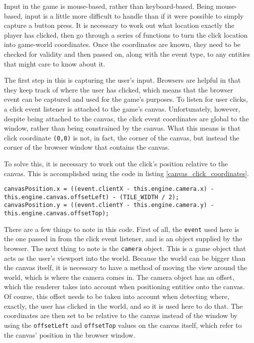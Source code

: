 Input in the game is mouse-based, rather than keyboard-based. Being mouse-based, input is a little more difficult to handle than if it were possible to simply capture a button press. It is necessary to work out what location exactly the player has clicked, then go through a series of functions to turn the click location into game-world coordinates. Once the coordinates are known, they need to be checked for validity and then passed on, along with the event type, to any entities that might care to know about it.

The first step in this is capturing the user's input. Browsers are helpful in that they keep track of where the user has clicked, which means that the browser event can be captured and used for the game's purposes. To listen for user clicks, a click event listener is attached to the game's canvas. Unfortunately, however, despite being attached to the canvas, the click event coordinates are global to the window, rather than being constrained by the canvas. What this means is that click coordinate \texttt{(0,0)} is not, in fact, the corner of the canvas, but instead the corner of the browser window that contains the canvas.

To solve this, it is necessary to work out the click's position relative to the canvas. This is accomplished using the code in listing \ref{canvas_click_coordinates}.

\noindent
\begin{minipage}{\linewidth}
\begin{lstlisting}[style=js, caption={Transforming a user's click to be relative to the canvas, rather than the window.}, label=canvas_click_coordinates]
canvasPosition.x = ((event.clientX - this.engine.camera.x) - this.engine.canvas.offsetLeft) - (TILE_WIDTH / 2);
canvasPosition.y = ((event.clientY - this.engine.camera.y) - this.engine.canvas.offsetTop);
\end{lstlisting}
\end{minipage}

There are a few things to note in this code. First of all, the \texttt{event} used here is the one passed in from the click event listener, and is an object supplied by the browser. The next thing to note is the \texttt{camera} object. This is a game object that acts as the user's viewport into the world. Because the world can be bigger than the canvas itself, it is necessary to have a method of moving the view around the world, which is where the camera comes in. The camera object has an offset, which the renderer takes into account when positioning entities onto the canvas. Of course, this offset needs to be taken into account when detecting where, exactly, the user has clicked in the world, and so it is used here to do that. The coordinates are then set to be relative to the canvas instead of the window by using the \texttt{offsetLeft} and \texttt{offsetTop} values on the canvas itself, which refer to the canvas' position in the browser window.

